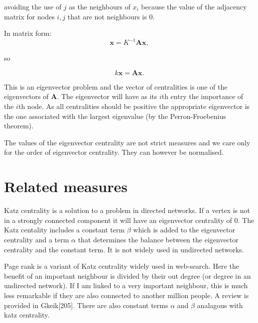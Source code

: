 avoiding the use of $j$ as the neighbours of $x_i$ because the value of the adjacency matrix for nodes $i,j$ that are not neighbours is 0.

In matrix form:
\begin{equation}
    \mathbf{x}=K^{-1}\mathbf{Ax},
    \end{equation}
    
    so
    
    \begin{equation}
         k\mathbf{x}=\mathbf{Ax}.
    \end{equation}
  
This is an eigenvector problem and the vector of centralities is one of the eigenvectors of $\mathbf{A}$. The eigenvector will have as its $i$th entry the importance of the $i$th node. As all centralities should be positive the appropriate eigenvector is the one associated with the largest eigenvalue (by the Perron-Froebenius theorem). 
  
   The values of the eigenvector centrality are not strict measures and we care only for the order of eigenvector centrality. They can however be normalised. 
  
 \section{Related measures}

Katz centrality is a solution to a problem in directed networks. If a vertex is not in a strongly connected component it will have an eigenvector centrality of 0. The Katz centality includes a constant term $\beta$ which is added to the eigenvector centrality and a term $\alpha$ that determines the balance between the eigenvector centrality and the constant term. It is not widely used in undirected networks.\cite{newman2018networks} 

Page rank is a variant of Katz centrality widely used in web-search. Here the benefit of an important neighbour is divided by their out degree (or degree in an undirected network). If I am linked to a very important neighbour, this is much less remarkable if they are also connected to another million people. A review is provided in Gkeik[205]. There are also constant terms $\alpha$ and $\beta$ analagous with katz centrality.\cite{newman2018networks} 
    
 

